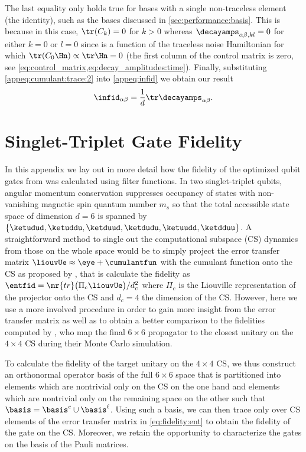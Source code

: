 The last equality only holds true for bases with a single non-traceless element (the identity), such as the bases discussed in \cref{sec:performance:basis}. This is because in this case, $\tr(C_k) = 0$ for $k > 0$ whereas $\decayamps_{\alpha\beta,kl} = 0$ for either $k = 0$ or $l = 0$ since \decayamps is a function of the traceless noise Hamiltonian for which $\tr(C_0\Hn) \propto \tr\Hn = 0$ (\ie the first column of the control matrix is zero, see \cref{eq:control_matrix,eq:decay_amplitudes:time}). Finally, substituting \cref{appeq:cumulant:trace:2} into \cref{appeq:infid} we obtain our result
\begin{equation}
    \infid_{\alpha\beta} = \frac{1}{d}\tr\decayamps_{\alpha\beta}.
\end{equation}
\section{Singlet-Triplet Gate Fidelity}\label{appsec:singlet-triplet}
In this appendix we lay out in more detail how the fidelity of the optimized \sts qubit gates from  was calculated using filter functions. In two singlet-triplet qubits, angular momentum conservation suppresses occupancy of states with non-vanishing magnetic spin quantum number $m_s$ so that the total accessible state space of dimension $d=6$ is spanned by $\lbrace\ketudud,\ketuddu,\ketduud,\ketdudu,\ketuudd,\ketdduu\rbrace$. A straightforward method to single out the computational subspace (CS) dynamics from those on the whole space would be to simply project the error transfer matrix $\liouvUe\approx\eye + \cumulantfun$ with \cumulantfun the cumulant function onto the CS as proposed by \citeauthor{Wood2018}, that is calculate the fidelity as $\entfid = \mr{tr}\bigl(\Pi_c\liouvUe\bigr)/d_c^2$ where $\Pi_c$ is the Liouville representation of the projector onto the CS and $d_c = 4$ the dimension of the CS. However, here we use a more involved procedure in order to gain more insight from the error transfer matrix as well as to obtain a better comparison to the fidelities computed by \citeauthor{Cerfontaine2019}, who map the final $6\times 6$ propagator to the closest unitary on the $4\times 4$ CS during their Monte Carlo simulation.

To calculate the fidelity of the target unitary on the $4\times 4$ CS, we thus construct an orthonormal operator basis \basis of the full $6\times 6$ space that is partitioned into elements which are nontrivial only on the CS on the one hand and elements which are nontrivial only on the remaining space on the other such that $\basis = \basis^c\cup\basis^\ell$. Using such a basis, we can then trace only over CS elements of the error transfer matrix \liouvUe in \cref{eq:fidelity:ent} to obtain the fidelity of the gate on the CS. Moreover, we retain the opportunity to characterize the gates on the basis of the Pauli matrices.

